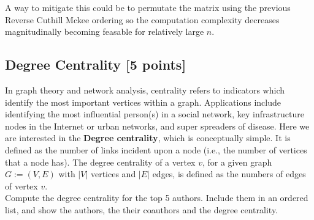 \documentclass[unicode,11pt,a4paper,oneside,numbers=endperiod,openany]{scrartcl}
\begin{document}
A way to mitigate this could be to permutate the matrix using the previous
Reverse Cuthill Mckee ordering so the computation complexity decreases magnitudinally
becoming feasable for relatively large $n$.

\cleardoublepage

\subsection{Degree Centrality [5 points]}

In graph theory and network analysis, centrality refers to indicators which identify
the most important vertices within a graph.
Applications include identifying the most influential person(s) in a social network,
key infrastructure nodes in the Internet or urban networks, and super spreaders of disease.
Here we are interested in the \textbf{Degree centrality}, which is conceptually simple.
It is defined as the number of links incident upon a node
(i.e., the number of vertices that a node has).
The degree centrality of a vertex $v$, for a given graph
$G := (V, E)$ with $|V|$ vertices and $|E|$ edges, is defined as the numbers of edges of vertex $v$. \\
Compute the degree centrality for the top 5 authors.
Include them in an ordered list, and show the authors, the their coauthors and the degree centrality. \\
\end{document}
